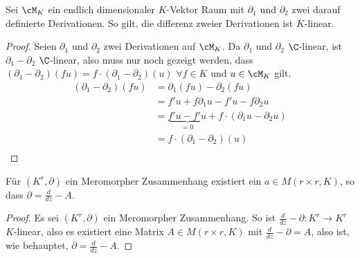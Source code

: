 \begin{lem} Sei $\cM_K$ %
 ein endlich dimensionaler $K$-Vektor Raum mit $\partial_1$ und $\partial_2$
zwei darauf definierte Derivationen. So gilt, die differenz zweier
Derivationen ist $K$-linear.
\end{lem}
\begin{proof}
Seien $\partial_1$ und $\partial_2$ zwei Derivationen auf $\cM_K$.
Da $\partial_1$ und $\partial_2$ $\C$-linear, ist $\partial_1-\partial_2$
$\C$-linear, also muss nur noch gezeigt werden, dass
$(\partial_1-\partial_2)(fu)=f\cdot(\partial_1-\partial_2)(u)$ $\forall f\in
K$ und $u\in\cM_K$ gilt.\\
\begin{align*}
(\partial_1-\partial_2)(fu) &= \partial_1(fu)-\partial_2(fu)\\
&= f'u+f\partial_1u-f'u-f\partial_2u\\
&= \underset{=0}{\underbrace{f'u-f'u}}+f\cdot(\partial_1u-\partial_2u)\\
&= f\cdot(\partial_1-\partial_2)(u)\\
\end{align*}
\end{proof}
\begin{cor}
Für $(K^r,\partial)$ ein Meromorpher Zusammenhang existiert ein $a\in M(r\times
r,K)$, so dass $\partial=\frac{d}{dz}-A$.
\end{cor}
\begin{proof}
Es sei $(K^r,\partial)$ ein Meromorpher Zusammenhang.  So ist
$\frac{d}{dz}-\partial:K^r\rightarrow K^r$ $K$-linear, also es existiert eine
Matrix $A\in M(r\times r,K)$ mit $\frac{d}{dz}-\partial=A$, also ist, wie
behauptet, $\partial=\frac{d}{dz}-A$.
\end{proof}



